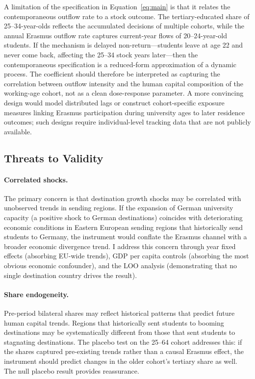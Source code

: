 \documentclass[12pt]{article}
\begin{document}
A limitation of the specification in Equation~\eqref{eq:main} is that it relates the contemporaneous outflow rate to a stock outcome. The tertiary-educated share of 25--34-year-olds reflects the accumulated decisions of multiple cohorts, while the annual Erasmus outflow rate captures current-year flows of 20--24-year-old students. If the mechanism is delayed non-return---students leave at age 22 and never come back, affecting the 25--34 stock years later---then the contemporaneous specification is a reduced-form approximation of a dynamic process. The coefficient should therefore be interpreted as capturing the correlation between outflow intensity and the human capital composition of the working-age cohort, not as a clean dose-response parameter. A more convincing design would model distributed lags or construct cohort-specific exposure measures linking Erasmus participation during university ages to later residence outcomes; such designs require individual-level tracking data that are not publicly available.

\subsection{Threats to Validity}
\label{sec:threats}

\paragraph{Correlated shocks.} The primary concern is that destination growth shocks may be correlated with unobserved trends in sending regions. If the expansion of German university capacity (a positive shock to German destinations) coincides with deteriorating economic conditions in Eastern European sending regions that historically send students to Germany, the instrument would conflate the Erasmus channel with a broader economic divergence trend. I address this concern through year fixed effects (absorbing EU-wide trends), GDP per capita controls (absorbing the most obvious economic confounder), and the LOO analysis (demonstrating that no single destination country drives the result).

\paragraph{Share endogeneity.} Pre-period bilateral shares may reflect historical patterns that predict future human capital trends. Regions that historically sent students to booming destinations may be systematically different from those that sent students to stagnating destinations. The placebo test on the 25--64 cohort addresses this: if the shares captured pre-existing trends rather than a causal Erasmus effect, the instrument should predict changes in the older cohort's tertiary share as well. The null placebo result provides reassurance.
\end{document}
